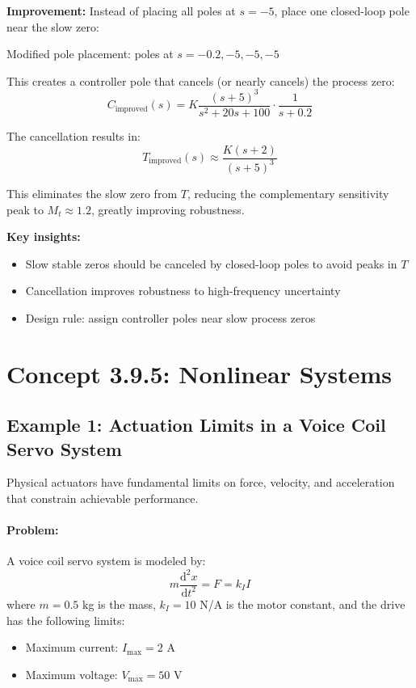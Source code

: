 \documentclass[11pt,a4paper]{article}
\begin{document}
\textbf{Improvement:}
Instead of placing all poles at $s = -5$, place one closed-loop pole near the slow zero:

Modified pole placement: poles at $s = -0.2, -5, -5, -5$

This creates a controller pole that cancels (or nearly cancels) the process zero:
\[
C_{\text{improved}}(s) = K\frac{(s + 5)^3}{s^2 + 20s + 100} \cdot \frac{1}{s + 0.2}
\]

The cancellation results in:
\[
T_{\text{improved}}(s) \approx \frac{K(s + 2)}{(s+5)^3}
\]

This eliminates the slow zero from $T$, reducing the complementary sensitivity peak to $M_t \approx 1.2$, greatly improving robustness.

\textbf{Key insights:}
\begin{itemize}
\item Slow stable zeros should be canceled by closed-loop poles to avoid peaks in $T$
\item Cancellation improves robustness to high-frequency uncertainty
\item Design rule: assign controller poles near slow process zeros
\end{itemize}

\section{Concept 3.9.5: Nonlinear Systems}

\subsection{Example 1: Actuation Limits in a Voice Coil Servo System}

Physical actuators have fundamental limits on force, velocity, and acceleration that constrain achievable performance.

\paragraph{Problem:}
A voice coil servo system is modeled by:
\[
m\frac{\mathrm{d}^2x}{\mathrm{d}t^2} = F = k_I I
\]
where $m = 0.5$ kg is the mass, $k_I = 10$ N/A is the motor constant, and the drive has the following limits:
\begin{itemize}
\item Maximum current: $I_{\max} = 2$ A
\item Maximum voltage: $V_{\max} = 50$ V
\end{itemize}
\end{document}
